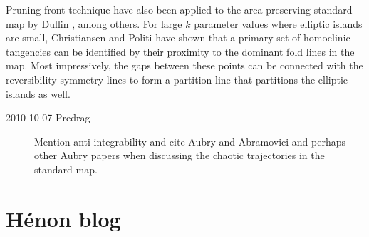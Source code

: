 {Pruning front technique have also been applied to the area-preserving
standard map by Dullin \etal{}, among others. For large
$k$ parameter values where elliptic islands are small, Christiansen and
Politi have shown that a primary set of homoclinic
tangencies can be identified by their proximity to the dominant fold
lines in the map. Most impressively, the gaps between these points can be
connected with the reversibility symmetry lines to form a partition
line that partitions the elliptic islands as
well.
} %


\RemarksEnd

\begin{description}

\item[2010-10-07 Predrag]
                                                            \toCB
Mention anti-integrability and cite Aubry and Abramovici
and perhaps other Aubry papers when
discussing the chaotic trajectories in the standard map.


\end{description}



\section{H\'enon blog}

